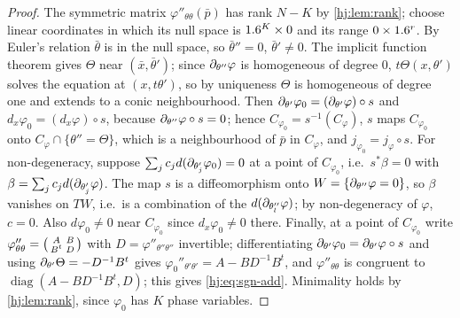 \begin{proof}
  The symmetric matrix $\varphi''_{\theta\theta}(\bar p)$ has rank $N-K$ by
  \cref{hj:lem:rank}; choose linear coordinates in which its null space is
  $1.6^K\times0$ and its range $0\times1.6^r$.  By Euler's relation $\bar\theta$ is
  in the null space, so $\bar\theta''=0$, $\bar\theta'\neq0$.  The implicit
  function theorem gives $\Theta$ near $(\bar x,\bar\theta')$; since
  $\partial_{\theta''}\varphi$ is homogeneous of degree $0$, $t\Theta(x,\theta')$
  solves the equation at $(x,t\theta')$, so by uniqueness $\Theta$ is
  homogeneous of degree one and extends to a conic neighbourhood.  Then
  $\partial_{\theta'}\varphi_0=(\partial_{\theta'}\varphi)\circ s$ and
  $d_x\varphi_0=(d_x\varphi)\circ s$, because $\partial_{\theta''}\varphi\circ s=0$;
  hence $C_{\varphi_0}=s^{-1}(C_\varphi)$, $s$ maps $C_{\varphi_0}$ onto
  $C_\varphi\cap\{\theta''=\Theta\}$, which is a neighbourhood of $\bar p$ in
  $C_\varphi$, and $j_{\varphi_0}=j_\varphi\circ s$.  For non-degeneracy, suppose
  $\sum_jc_jd(\partial_{\theta'_j}\varphi_0)=0$ at a point of $C_{\varphi_0}$, i.e.\
  $s^*\beta=0$ with $\beta=\sum_jc_jd(\partial_{\theta'_j}\varphi)$.  The map $s$ is a
  diffeomorphism onto $W=\{\partial_{\theta''}\varphi=0\}$, so $\beta$ vanishes on
  $TW$, i.e.\ is a combination of the $d(\partial_{\theta''_l}\varphi)$; by
  non-degeneracy of $\varphi$, $c=0$.  Also $d\varphi_0\ne0$ near
  $C_{\varphi_0}$ since $d_x\varphi_0\ne0$ there.  Finally, at a point of
  $C_{\varphi_0}$ write $\varphi''_{\theta\theta}=\begin{psmallmatrix}A&B\\
  B^t&D\end{psmallmatrix}$ with $D=\varphi''_{\theta''\theta''}$ invertible;
  differentiating $\partial_{\theta'}\varphi_0=\partial_{\theta'}\varphi\circ s$ and using
  $\partial_{\theta'}\Theta=-D^{-1}B^t$ gives $\varphi_0''{}_{\theta'\theta'}=A-BD^{-1}B^t$,
  and $\varphi''_{\theta\theta}$ is congruent to $\operatorname{diag}(A-BD^{-1}B^t,D)$;
  this gives \eqref{hj:eq:sgn-add}.  Minimality holds by \cref{hj:lem:rank},
  since $\varphi_0$ has $K$ phase variables.
\end{proof}

